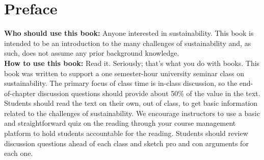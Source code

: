 \clearpage
 
 
 
 
\blankpage

{
\chapter*{Preface}
\thispagestyle{plain}

\noindent
\textbf{Who should use this book:} Anyone interested in sustainability. 
This book is intended to be an introduction to the many challenges of 
sustainability and, as such, does not assume any prior background knowledge. \\

\textbf{How to use this book:} Read it. Seriously; that's what you do with books.
This book was written to support a one semester-hour university seminar class
on sustainability. The primary focus of class time is in-class discussion, so 
the end-of-chapter discussion questions should provide about 50\% of the value
in the text. Students should read the text on their own, out of class, to get 
basic information related to  the challenges of sustainability. We encourage 
instructors to use a basic and straightforward quiz on the reading through your 
course management platform to hold students accountable for the reading. 
Students should review discussion questions ahead of each class and sketch 
pro and con arguments for each one. \\

}
